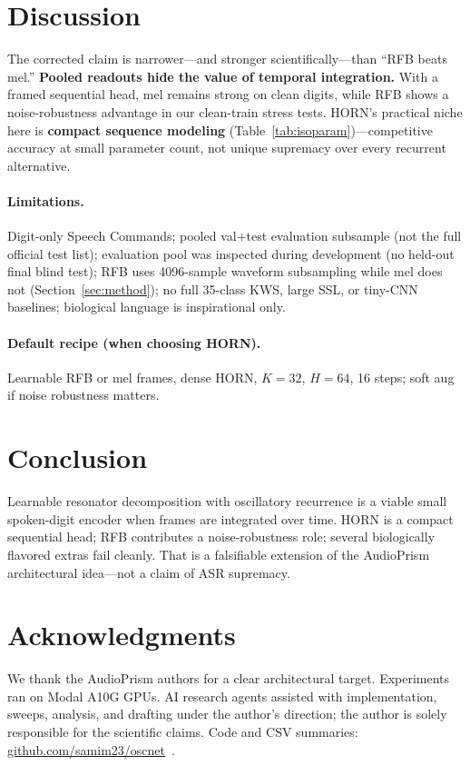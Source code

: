 \documentclass[11pt,a4paper]{article}
\begin{document}
\section{Discussion}
\label{sec:discuss}

The corrected claim is narrower---and stronger scientifically---than ``RFB beats
mel.'' \textbf{Pooled readouts hide the value of temporal integration.} With a
framed sequential head, mel remains strong on clean digits, while RFB shows a
noise-robustness advantage in our clean-train stress tests. HORN's practical
niche here is \textbf{compact sequence modeling}
(Table~\ref{tab:isoparam})---competitive accuracy at small parameter count,
not unique supremacy over every recurrent alternative.

\paragraph{Limitations.}
Digit-only Speech Commands; pooled val$+$test evaluation subsample (not the
full official test list); evaluation pool was inspected during development
(no held-out final blind test); RFB uses 4096-sample waveform subsampling while
mel does not (Section~\ref{sec:method}); no full 35-class KWS, large SSL, or
tiny-CNN baselines; biological language is inspirational only.

\paragraph{Default recipe (when choosing HORN).}
Learnable RFB or mel frames, dense HORN, $K{=}32$, $H{=}64$, 16 steps; soft
aug if noise robustness matters.

\section{Conclusion}
\label{sec:concl}

Learnable resonator decomposition with oscillatory recurrence is a viable
small spoken-digit encoder when frames are integrated over time. HORN is a
compact sequential head; RFB contributes a noise-robustness role; several
biologically flavored extras fail cleanly. That is a falsifiable extension of
the AudioPrism architectural idea---not a claim of ASR supremacy.

\section*{Acknowledgments}
We thank the AudioPrism authors for a clear architectural target.
Experiments ran on Modal A10G GPUs. AI research agents assisted with
implementation, sweeps, analysis, and drafting under the author's direction;
the author is solely responsible for the scientific claims. Code and CSV
summaries:
\href{https://github.com/samim23/oscnet}{github.com/samim23/oscnet}~\citep{oscnet2026github}.
\end{document}
